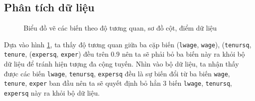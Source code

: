\subsection*{Phân tích dữ liệu}
\begin{figure}[H]
	\centering
	 \hfill
	\caption{Biểu đồ vẽ các biến theo độ tương quan, sơ đồ cột, điểm dữ liệu}
	\label{plot_data4}
\end{figure}

Dựa vào hình \ref{plot_data4}, ta thấy độ tương quan giữa ba cặp biến (\texttt{lwage}, \texttt{wage}), (\texttt{tenursq}, \texttt{tenure}, (\texttt{expersq}, \texttt{exper}) đều trên $0.9$ nên ta sẽ phải bỏ ba biến này ra khỏi bộ dữ liệu để tránh hiện tượng đa cộng tuyến. Nhìn vào bộ dữ liệu, ta nhận thấy được các biến \texttt{lwage}, \texttt{tenursq}, \texttt{expersq} đều là sự biến đổi từ ba biến \texttt{wage}, \texttt{tenure}, \texttt{exper} ban đầu nên ta sẽ quyết định bỏ hẳn 3 biến \texttt{lwage}, \texttt{tenursq}, \texttt{expersq} này ra khỏi bộ dữ liệu.

